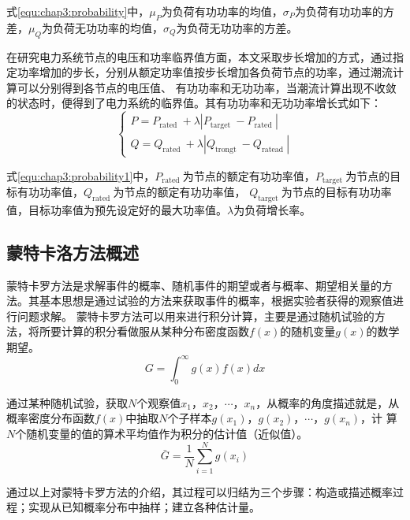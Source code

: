 式\ref{equ:chap3:probability}中，$\mu_{P}$为负荷有功功率的均值，$\sigma_{P}$为负荷有功功率的方差，$\mu_{Q}$为负荷无功功率的均值，$\sigma_{Q}$为负荷无功功率的方差。

在研究电力系统节点的电压和功率临界值方面，本文采取步长增加的方式，通过指定功率增加的步长，分别从额定功率值按步长增加各负荷节点的功率，通过潮流计算可以分别得到各节点的电压值、
有功功率和无功功率，当潮流计算出现不收敛的状态时，便得到了电力系统的临界值。其有功功率和无功功率增长式如下：
\begin{equation}
  \label{equ:chap3:probability1}
  \left\{\begin{array}{l}{P=P_{\text {rated }}+\lambda\left|P_{\text {target }}-P_{\text {rated }}\right|} \\
   {Q=Q_{\text {rated }}+\lambda\left|Q_{\text {trongt }}-Q_{\text {ratead }}\right|}\end{array}\right.
  \end{equation}

式\ref{equ:chap3:probability1}中，$P_{\text {rated }}$为节点的额定有功功率值，$P_{\text {target }}$为节点的目标有功功率值，$Q_{\text {rated }}$为节点的额定有功功率值，
$Q_{\text {target }}$为节点的目标有功功率值，目标功率值为预先设定好的最大功率值。$\lambda$为负荷增长率。

\subsection{蒙特卡洛方法概述}
\label{sec:vulneStaus}
蒙特卡罗方法是求解事件的概率、随机事件的期望或者与概率、期望相关量的方法。其基本思想是通过试验的方法来获取事件的概率，根据实验者获得的观察值进行问题求解\cite{refs73,refs74,refs75}。
蒙特卡罗方法可以用来进行积分计算，主要是通过随机试验的方法，将所要计算的积分看做服从某种分布密度函数$f(x)$的随机变量$g(x)$的数学期望。
\begin{equation}
  G=\int_{0}^{\infty} g(x) f(x) d x
  \end{equation}

通过某种随机试验，获取$N$个观察值$x_1，x_2，\cdots，x_n$，从概率的角度描述就是，从概率密度分布函数$f(x)$中抽取$N$个子样本$g(x_1 )，g(x_2 )，\cdots，g(x_n )$，计
算$N$个随机变量的值的算术平均值作为积分的估计值（近似值）。
\begin{equation}
  \bar{G}=\frac{1}{N} \sum_{i=1}^{N} g\left(x_{i}\right)
  \end{equation}



通过以上对蒙特卡罗方法的介绍，其过程可以归结为三个步骤：构造或描述概率过程；实现从已知概率分布中抽样；建立各种估计量。

